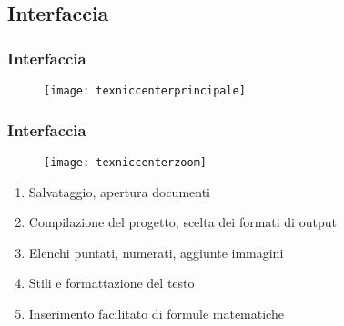 \subsection{Interfaccia}
\begin{frame}
  \frametitle{Interfaccia}
  
  \begin{figure}
   \centering
   \texttt{[image: texniccenterprincipale]}
  \end{figure}
\end{frame}


\begin{frame}
  \frametitle{Interfaccia}
  
  \begin{figure}
   \centering
   \texttt{[image: texniccenterzoom]}
  \end{figure}
  
  \begin{enumerate}
   \item Salvataggio, apertura documenti
   \item Compilazione del progetto, scelta dei formati di output
   \item Elenchi puntati, numerati, aggiunte immagini
   \item Stili e formattazione del testo
   \item Inserimento facilitato di formule matematiche
  \end{enumerate}

\end{frame}